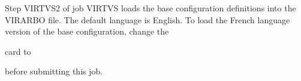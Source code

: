 \documentclass[letterpaper,10pt,english]{sphinxmanual}
\begin{document}
\sphinxAtStartPar
{}

\sphinxAtStartPar
Step VIRTVS2 of job VIRTVS loads the base configuration definitions into the VIRARBO file. The default language is English. To load the French language version of the base configuration, change the

\begin{sphinxVerbatim}[commandchars=\\\{\}]
  
\end{sphinxVerbatim}

\sphinxAtStartPar
card to

\begin{sphinxVerbatim}[commandchars=\\\{\}]
  
\end{sphinxVerbatim}

\sphinxAtStartPar
before submitting this job.
\end{document}
